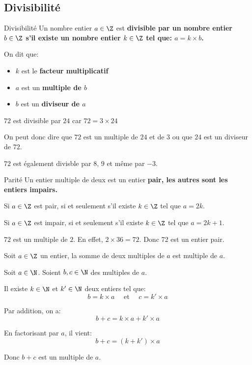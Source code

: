 
\subsection{Divisibilité}

\begin{defi}{Divisibilité}{}
Un nombre entier $a\in\Z$ est \bf{divisible} par un nombre entier $b\in\Z$ s'il existe un nombre entier $k\in\Z$ tel que: $a=k\times b$.

On dit que:
\begin{itemize}
	\item $k$ est le \bf{facteur multiplicatif}
	\item $a$ est un \bf{multiple} de $b$
	\item $b$ est un \bf{diviseur} de $a$
\end{itemize}
\end{defi}

\begin{ex}{}{}
$72$ est divisible par $24$ car $72 = 3\times 24$

 On peut donc dire que $72$ est un multiple de $24$ et de $3$ ou que $24$ est un diviseur de $72$.
\end{ex}

\begin{rem}
	$72$ est également divisble par $8$, $9$ et même par $-3$.
\end{rem}

\begin{defi}{Parité}{}
Un entier multiple de deux est un entier \bf{pair}, les autres sont les entiers \bf{impairs}.
\end{defi}

\begin{prop}{}{}
Si $a\in\Z$ est pair, si et seulement s'il existe $k\in\Z$ tel que $a=2k$.

Si $a\in\Z$ est impair, si et seulement s'il existe $k\in\Z$ tel que $a=2k+1$.
\end{prop}

\begin{ex}{}{}
$72$ est un multiple de $2$. En effet, $2\times 36 = 72$. Donc 72 est un entier pair.
\end{ex}

\begin{prop}{}{}
Soit $a\in\Z$ un entier, la somme de deux multiples de $a$ est multiple de $a$.
\end{prop}

\begin{deme}{}{}
Soit $a\in\N$. Soient $b, c\in\N$ des multiples de $a$.

Il existe $k\in\N$ et $k'\in\N$ deux entiers tel que:
$$ b =k\times a  \quad \text{ et } \quad c = k' \times a$$

Par addition, on a:
$$ b + c = k\times a  + k' \times a $$

En factorisant par $a$, il vient: 
$$ b + c = (k  + k') \times a $$

Donc $b+c$ est un multiple de $a$.
\end{deme}


